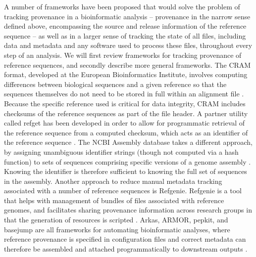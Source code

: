 \documentclass[12pt]{article} \usepackage[utf8]{inputenc}
\begin{document}
A number of frameworks have been proposed that would solve the problem
of tracking provenance in a bioinformatic analysis -- provenance in
the narrow sense defined above, encompassing the source and release
information of the reference sequence -- as well as in a larger sense
of tracking the state of all files, including data and metadata and
any software used to process these files, throughout every step of an
analysis. We will first review frameworks for tracking provenance of
reference sequences, and secondly describe more general
frameworks. The CRAM format, developed at the European Bioinformatics Institute, involves computing
differences between biological sequences and a given reference so that
the sequences themselves do not need to be stored in full within an
alignment file \citep{cram}. Because the specific reference used is
critical for data integrity, CRAM includes checksums of the reference
sequences as part of the file header. A partner utility called refget
has been developed in order to allow for programmatic retrieval of the
reference sequence from a computed checksum, which acts as an
identifier of the reference sequence \citep{refget}. The NCBI Assembly
database takes a different approach, by assigning unambiguous
identifier strings (though not computed via a hash function) to sets
of sequences comprising specific versions of a genome assembly
\citep{ncbi-assembly}. Knowing the identifier is therefore sufficient
to knowing the full set of sequences in the assembly.
Another approach to reduce manual metadata tracking associated with a number of
reference sequences is Refgenie. Refgenie is a tool that helps with
management of bundles of files associated with reference genomes, and
facilitates sharing provenance information across research groups in
that the generation of resources is scripted \citep{refgenie}. Arkas,
ARMOR, pepkit, and basejump are all frameworks for automating
bioinformatic analyses, where reference provenance is specified in
configuration files and correct metadata can therefore be assembled
and attached programmatically to downstream outputs
\citep{arkas,Orjuelag2019,pepkit,basejump}.
\end{document}
